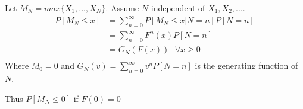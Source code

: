 \documentclass[11pt,a4paper,oneside]{article}
\begin{document}
Let $M_N=max\{X_1,...,X_N\}$. Assume $N$ independent of $X_1,X_2,....$
\begin{align*}
P[M_N\leq x]&=\displaystyle\sum_{n=0}^{\infty}P[M_N\leq x|N=n]P[N=n]\\
&=\displaystyle\sum_{n=0}^{\infty}F^n(x)P[N=n]\\
&=G_N(F(x))\ \ \ \forall x\geq 0\\
\end{align*}
Where $M_0=0$ and $G_N(v)=\displaystyle\sum_{n=0}^{\infty}v^nP[N=n]$ is the generating function of $N$.

Thus $P[M_N\leq 0]$ if $F(0)=0$
\end{document}
